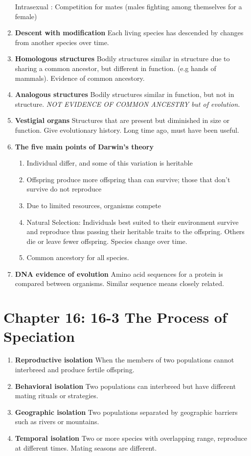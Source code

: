 \documentclass[9pt]{article}
\begin{document}
\begin{enumerate}
  Intrasexual : Competition for mates (males fighting among themselves for a female)
  \item {\bf Descent with modification} Each living species has descended by changes from another species over time.
  \item {\bf Homologous structures} Bodily structures similar
    in structure due to sharing a common ancestor, but different in
    function. (e.g hands of mammals). Evidence of common ancestory.
  \item {\bf Analogous structures} Bodily structures similar in
    function, but not in structure.  {\em NOT EVIDENCE OF COMMON ANCESTRY
    but of evolution.}
  \item {\bf Vestigial organs} Structures that are present but
    diminished in size or function. Give evolutionary history. Long
    time ago, must have been useful.
  \item {\bf The five main points of Darwin's theory}
    \begin{enumerate}
    \item Individual differ, and some of this variation is heritable
    \item Offspring produce more offspring than can survive; those
      that don’t survive do not reproduce
    \item Due to limited resources, organisms compete
    \item Natural Selection: Individuals best suited to their
      environment survive and reproduce thus passing their heritable
      traits to the offspring. Others die or leave fewer
      offspring. Species change over time.
    \item Common ancestory for all species.
    \end{enumerate}
  \item {\bf DNA evidence of evolution} Amino acid sequences for a protein is compared between organisms. Similar sequence means closely related.
\end{enumerate}
\section*{Chapter 16: 16-3 The Process of Speciation}
\begin{enumerate}
  \item {\bf Reproductive isolation} When the members of two
    populations cannot interbreed and produce fertile offspring.
  \item {\bf Behavioral isolation} Two populations can interbreed but
    have different mating rituals or strategies.
  \item {\bf Geographic isolation} Two populations separated by
    geographic barriers such as rivers or mountains.
  \item {\bf Temporal isolation} Two or more species with overlapping
    range, reproduce at different times. Mating seasons are different.
\end{enumerate}
\end{document}
